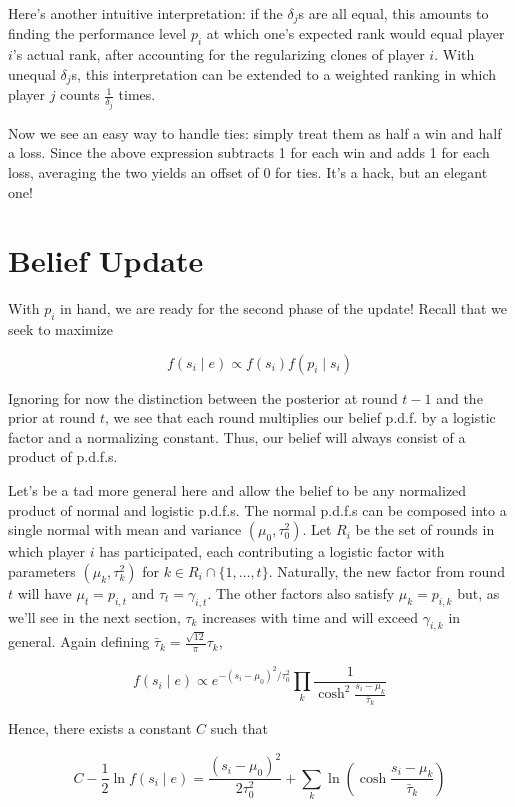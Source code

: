 \documentclass{article}
\begin{document}
Here's another intuitive interpretation: if the $\delta_j$s are all equal, this amounts to finding the performance level $p_i$ at which one's expected rank would equal player $i$'s actual rank, after accounting for the regularizing clones of player $i$. With unequal $\delta_j$s, this interpretation can be extended to a weighted ranking in which player $j$ counts $\frac{1}{\delta_j}$ times.

Now we see an easy way to handle ties: simply treat them as half a win and half a loss. Since the above expression subtracts 1 for each win and adds 1 for each loss, averaging the two yields an offset of 0 for ties. It's a hack, but an elegant one!

\section{Belief Update}

With $p_i$ in hand, we are ready for the second phase of the update! Recall that we seek to maximize

\[f(s_i\mid e) \propto f(s_i)f(p_i\mid s_i)\]

Ignoring for now the distinction between the posterior at round $t-1$ and the prior at round $t$, we see that each round multiplies our belief p.d.f. by a logistic factor and a normalizing constant. Thus, our belief will always consist of a product of p.d.f.s.

Let's be a tad more general here and allow the belief to be any normalized product of normal and logistic p.d.f.s. The normal p.d.f.s can be composed into a single normal with mean and variance $(\mu_0, \tau_0^2)$. Let $R_i$ be the set of rounds in which player $i$ has participated, each contributing a logistic factor with parameters $(\mu_k, \tau_k^2)$ for $k\in R_i\cap \{1,\ldots,t\}$. Naturally, the new factor from round $t$ will have $\mu_t = p_{i,t}$ and $\tau_t = \gamma_{i,t}$. The other factors also satisfy $\mu_k = p_{i,k}$ but, as we'll see in the next section, $\tau_k$ increases with time and will exceed $\gamma_{i,k}$ in general. Again defining $\bar\tau_k = \frac{\sqrt{12}}{\pi} \tau_k$,

\[
f(s_i\mid e)
\propto e^{-(s_i-\mu_0)^2/\tau_0^2} \prod_k \frac { 1 } { \cosh^2\frac{s_i-\mu_k} {\bar\tau_k} }
\]

Hence, there exists a constant $C$ such that

\[C - \frac 1 2 \ln f(s_i \mid e) = \frac{(s_i-\mu_0)^2}{2\tau_0^2} + \sum_k \ln\left( \cosh\frac{s_i-\mu_k}{\bar\tau_k} \right)\]
\end{document}
